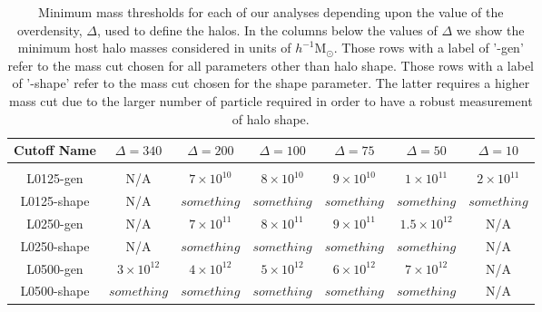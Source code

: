 \documentclass[usenatbib]{mnras}
\begin{document}
\begin{table}
\caption{
Minimum mass thresholds for each of our analyses depending upon the 
value of the overdensity, $\Delta$, used to define the halos. 
In the columns below the values of $\Delta$ we show the minimum 
host halo masses considered in units of $h^{-1}\mathrm{M}_{\odot}$.
Those rows with a label of '-gen' refer to the mass cut chosen for all parameters other than
halo shape. Those rows with a label of '-shape' refer to the mass cut chosen for the shape parameter.
The latter requires a higher mass cut due to the larger number of particle required in order to have a
robust measurement of halo shape. 
}
\vspace*{8pt}
\begin{tabular}{ c c c c c c c }
\hline
\hline
Cutoff Name &  $\Delta=340$ & $\Delta=200$ & $\Delta=100$ & $\Delta=75$ & $\Delta=50$ & $\Delta=10$ \\
\hline
\\{L0125-gen} & {N/A} & $7 \times 10^{10}$ & $8 \times 10^{10}$ & $9 \times 10^{10}$ & $1 \times 10^{11}$ & $2 \times 10^{11}$  \\
{L0125-shape} & {N/A} & $ something $ & $ something $ & $ something $ & $ something $ & $ something $ \\
{L0250-gen} & {N/A} & $7 \times 10^{11}$ & $8 \times 10^{11}$ & $9 \times 10^{11}$ & $1.5 \times 10^{12}$ & {N/A} \\
{L0250-shape} & {N/A} & $ something $ & $ something $ & $ something $ & $ something $ & {N/A} \\
{L0500-gen} & $3 \times 10^{12}$ & $4 \times 10^{12}$ & $5 \times 10^{12}$ & $6 \times 10^{12}$ & $7 \times 10^{12}$ & {N/A} \\
{L0500-shape} & $ something $ & $ something $ & $ something $ & $ something $ & $ something $ & {N/A} \\
\hline
\hline
\end{tabular}
\label{table:thresholds}
\end{table}

\end{document}
